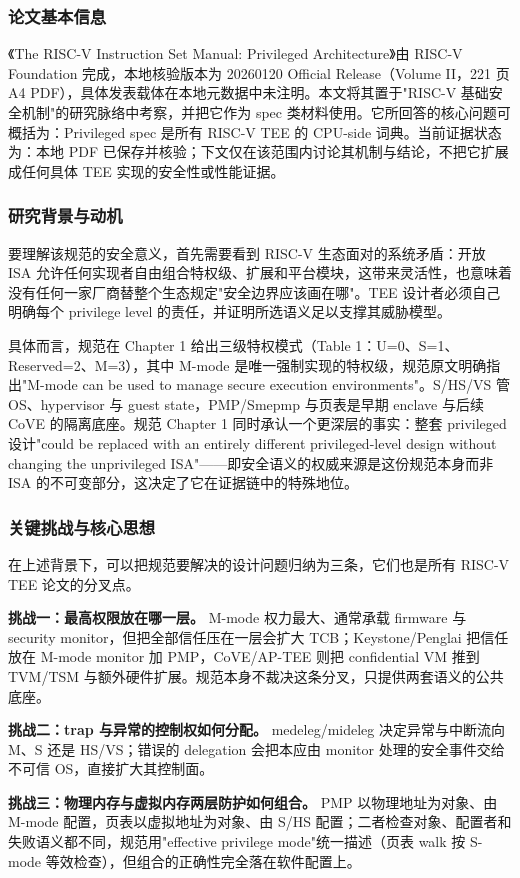 \documentclass[11pt]{ctexart}
\begin{document}
\subsubsection{论文基本信息}
《The RISC-V Instruction Set Manual: Privileged Architecture》由 RISC-V Foundation 完成，本地核验版本为 20260120 Official Release（Volume II，221 页 A4 PDF），具体发表载体在本地元数据中未注明。本文将其置于"RISC-V 基础安全机制"的研究脉络中考察，并把它作为 spec 类材料使用。它所回答的核心问题可概括为：Privileged spec 是所有 RISC-V TEE 的 CPU-side 词典。当前证据状态为：本地 PDF 已保存并核验；下文仅在该范围内讨论其机制与结论，不把它扩展成任何具体 TEE 实现的安全性或性能证据。\cite{riscv_privileged}\par
\subsubsection{研究背景与动机}
要理解该规范的安全意义，首先需要看到 RISC-V 生态面对的系统矛盾：开放 ISA 允许任何实现者自由组合特权级、扩展和平台模块，这带来灵活性，也意味着没有任何一家厂商替整个生态规定"安全边界应该画在哪"。TEE 设计者必须自己明确每个 privilege level 的责任，并证明所选语义足以支撑其威胁模型。\par
具体而言，规范在 Chapter 1 给出三级特权模式（Table 1：U=0、S=1、Reserved=2、M=3），其中 M-mode 是唯一强制实现的特权级，规范原文明确指出"M-mode can be used to manage secure execution environments"。S/HS/VS 管 OS、hypervisor 与 guest state，PMP/Smepmp 与页表是早期 enclave 与后续 CoVE 的隔离底座。规范 Chapter 1 同时承认一个更深层的事实：整套 privileged 设计"could be replaced with an entirely different privileged-level design without changing the unprivileged ISA"——即安全语义的权威来源是这份规范本身而非 ISA 的不可变部分，这决定了它在证据链中的特殊地位。\par
\subsubsection{关键挑战与核心思想}
在上述背景下，可以把规范要解决的设计问题归纳为三条，它们也是所有 RISC-V TEE 论文的分叉点。\par
\noindent\textbf{挑战一：最高权限放在哪一层。} M-mode 权力最大、通常承载 firmware 与 security monitor，但把全部信任压在一层会扩大 TCB；Keystone/Penglai 把信任放在 M-mode monitor 加 PMP，CoVE/AP-TEE 则把 confidential VM 推到 TVM/TSM 与额外硬件扩展。规范本身不裁决这条分叉，只提供两套语义的公共底座。\par
\noindent\textbf{挑战二：trap 与异常的控制权如何分配。} medeleg/mideleg 决定异常与中断流向 M、S 还是 HS/VS；错误的 delegation 会把本应由 monitor 处理的安全事件交给不可信 OS，直接扩大其控制面。\par
\noindent\textbf{挑战三：物理内存与虚拟内存两层防护如何组合。} PMP 以物理地址为对象、由 M-mode 配置，页表以虚拟地址为对象、由 S/HS 配置；二者检查对象、配置者和失败语义都不同，规范用"effective privilege mode"统一描述（页表 walk 按 S-mode 等效检查），但组合的正确性完全落在软件配置上。\par
\end{document}
